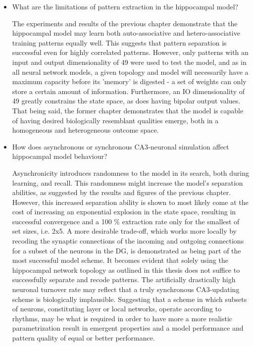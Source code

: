 \begin{itemize}
    \item What are the limitations of pattern extraction in the hippocampal model?
    
    The experiments and results of the previous chapter demonstrate that the hippocampal model may learn both auto-associative and hetero-associative training patterns equally well. This suggests that pattern separation is successful even for highly correlated patterns. However, only patterns with an input and output dimensionality of 49 were used to test the model, and as in all neural network models, a given topology and model will necessarily have a maximum capacity before its 'memory' is digested - a set of weights can only store a certain amount of information. Furthermore, an IO dimensionality of 49 greatly constrains the state space, as does having bipolar output values. That being said, the former chapter demonstrates that the model is capable of having desired biologically resemblant qualities emerge, both in a homogeneous and heterogeneous outcome space.
    
    \item How does asynchronous or synchronous CA3-neuronal simulation affect hippocampal model behaviour?
    
    Asynchronicity introduces randomness to the model in its search, both during learning, and recall. This randomness might increase the model's separation abilities, as suggested by the results and figures of the previous chapter. However, this increased separation ability is shown to most likely come at the cost of increasing an exponential explosion in the state space, resulting in successful convergence and a 100 \% extraction rate only for the smallest of set sizes, i.e. 2x5. A more desirable trade-off, which works more locally by recoding the synaptic connections of the incoming and outgoing connections for a subset of the neurons in the DG, is demonstrated as being part of the most successful model scheme. It becomes evident that solely using the hippocampal network topology as outlined in this thesis does not suffice to successfully separate and recode patterns. The artificially drastically high neuronal turnover rate may reflect that a truly synchronous CA3-updating scheme is biologically implausible. Suggesting that a scheme in which subsets of neurons, constituting layer or local networks, operate according to rhythms, may be what is required in order to have more a more realistic parametrization result in emergent properties and a model performance and pattern quality of equal or better performance.
    

\end{itemize}
